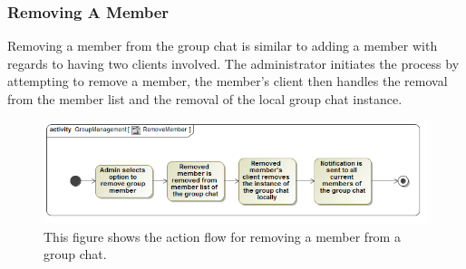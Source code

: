 \documentclass[11pt]{article}
\begin{document}
\subsubsection{Removing A Member}
Removing a member from the group chat is similar to adding a member with regards to having two clients involved. The administrator initiates the process by attempting to remove a member, the member's client then handles the removal from the member list and the removal of the local group chat instance.
\begin{figure}[H]
\centering
\includegraphics[width=5in]{./images/activity_remove_member.png}
\caption[Add Member Activity Diagram]{This figure shows the action flow for removing a member from a group chat.}
\label{ad-remove-member}
\end{figure}
\end{document}
